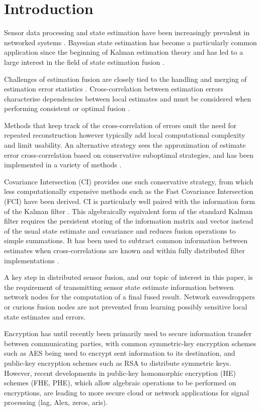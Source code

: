 \documentclass[letterpaper, 10 pt, conference]{ieeeconf}  %
\begin{document}
\section{Introduction}
Sensor data processing and state estimation have been increasingly prevalent in networked systems \cite{}. Bayesian state estimation has become a particularly common application since the beginning of Kalman estimation theory \cite{} and has led to a large interest in the field of state estimation fusion \cite{}.

Challenges of estimation fusion are closely tied to the handling and merging of estimation error statistics \cite{}. Cross-correlation between estimation errors characterise dependencies between local estimates and must be considered when performing consistent or optimal fusion \cite{}.

Methods that keep track of the cross-correlation of errors omit the need for repeated reconstruction \cite{} however typically add local computational complexity and limit usability. An alternative strategy sees the approximation of estimate error cross-correlation based on conservative suboptimal strategies, and has been implemented in a variety of methods \cite{}.

Covariance Intersection (CI) \cite{} provides one such conservative strategy, from which less computationally expensive methods such as the Fast Covariance Intersection (FCI) \cite{} have been derived. CI is particularly well paired with the information form of the Kalman filter \cite{}. This algebraically equivalent form of the standard Kalman filter requires the persistent storing of the information matrix and vector instead of the usual state estimate and covariance and reduces fusion operations to simple summations. It has been used to subtract common information between estimates when cross-correlations are known \cite{} and within fully distributed filter implementations \cite{}.


A key step in distributed sensor fusion, and our topic of interest in this paper, is the requirement of transmitting sensor state estimate information between network nodes for the computation of a final fused result. Network eavesdroppers or curious fusion nodes are not prevented from learning possibly sensitive local state estimates and errors.

Encryption has until recently been primarily used to secure information transfer between communicating parties, with common symmetric-key encryption schemes such as AES \cite{} being used to encrypt sent information to its destination, and public-key encryption schemes such as RSA \cite{} to distribute symmetric keys. However, recent developments in public-key homomorphic encryption (HE) schemes \cite{}(FHE, PHE), which allow algebraic operations to be performed on encryptions, are leading to more secure cloud or network applications for signal processing \cite{}(lag, Alex, zeros, aris).
\end{document}
